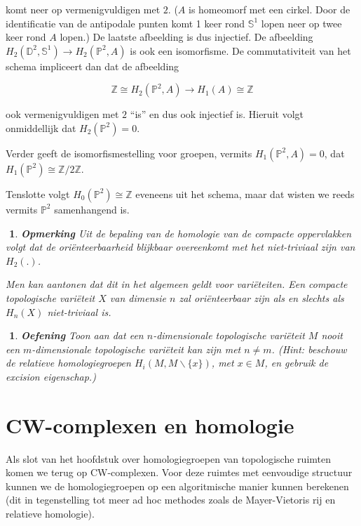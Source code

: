 \documentclass[12pt]{book}
\newcommand{\Z}{\mathbb{Z}}
\newcommand{\D}{\mathbb{D}}
\newcommand{\Sf}{\mathbb{S}}
\newtheorem{opmh}[stelh]{$\!\!$}
\newenvironment{eopm}{\begin{opmh} \em {\bf Opmerking }}{\end{opmh}}
\newtheorem{eoef}{$\!\!$}[chapter]
\newenvironment{oef}{\begin{eoef} {\bf Oefening}}{\end{eoef}}
\begin{document}
komt neer op vermenigvuldigen met $2$. ($A$ is homeomorf met een cirkel. Door de identificatie van de antipodale punten  komt 1 keer rond $\Sf^1$ lopen neer op twee keer rond  $A$ lopen.) De laatste afbeelding is
dus injectief. De afbeelding $H_2(\D^2, \Sf^1)\to H_{2}(\mathbb{P}^2, A)$ is ook een isomorfisme. De commutativiteit van het schema impliceert dan dat de afbeelding 

\[ \Z\cong H_2(\mathbb{P}^2, A)\to H_1(A)\cong \Z\] 

ook vermenigvuldigen met $2$ ``is'' en dus ook injectief is. Hieruit volgt onmiddellijk dat $H_2(\mathbb{P}^2)=0$.

Verder geeft de isomorfismestelling voor groepen, vermits $H_{1}(\mathbb{P}^2, A)=0$,  dat $H_1(\mathbb{P}^2)\cong \Z/2\Z$.

Tenslotte volgt $H_0(\mathbb{P}^2)\cong \Z$ eveneens uit het schema, maar dat wisten we reeds vermits $\mathbb{P}^2$ samenhangend is.\\



\begin{eopm} Uit de bepaling van de homologie van de compacte oppervlakken volgt dat de
ori\"enteerbaarheid blijkbaar overeenkomt met het niet-triviaal zijn van  $H_2(.)$.

Men kan aantonen dat dit in het algemeen geldt voor vari\"eteiten. Een compacte topologische
vari\"eteit $X$ van dimensie $n$ zal ori\"enteerbaar zijn als en slechts als $H_{n}(X)$
niet-triviaal is.
\end{eopm}

\begin{oef}
Toon aan dat een $n$-dimensionale topologische vari\"eteit $M$ nooit een $m$-dimensionale topologische vari\"eteit kan zijn met $n \neq m$. (Hint: beschouw de relatieve homologiegroepen $H_i(M,M\backslash \{x\})$, met $x\in M$, en gebruik de excision eigenschap.)
\end{oef}


\section{CW-complexen en homologie }

Als slot van het hoofdstuk over homologiegroepen van topologische ruimten komen we terug op CW-complexen. Voor deze ruimtes met eenvoudige structuur kunnen we de homologiegroepen op een algoritmische manier kunnen berekenen (dit in tegenstelling tot  meer ad hoc methodes zoals de Mayer-Vietoris rij en relatieve homologie). 
\end{document}
